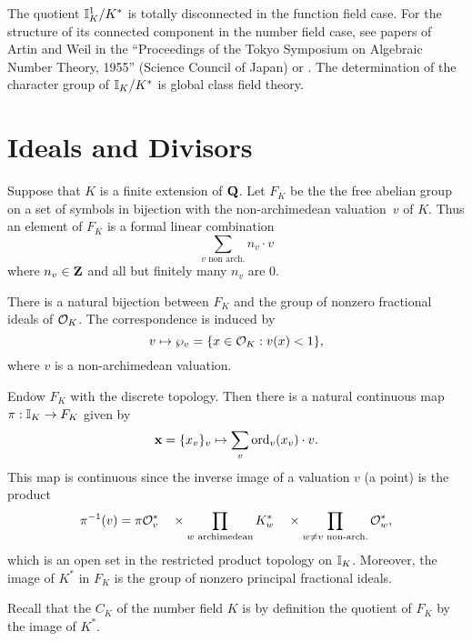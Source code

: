 \begin{remark}
  The quotient $\mathbb{I}_K^1/K^*$ is totally disconnected in the function
  field case.  For the structure of its connected component in the
  number field case, see papers of Artin and Weil in the ``Proceedings
  of the Tokyo Symposium on Algebraic Number Theory, 1955'' (Science
  Council of Japan) or \cite{artin-tate:cft}. The determination of the
  character group of $\mathbb{I}_K/K^*$ is global class field theory.
\end{remark}

\section{Ideals and Divisors}
Suppose that $K$ is a finite extension of $\mathbf{Q}$.  Let $F_K$ be the the
free abelian group on a set of symbols in bijection with the
non-archimedean valuation~$v$ of $K$.  Thus an element of $F_K$
is a formal linear combination 
$$
  \sum_{v\text{ non arch.}} n_v \cdot v
$$
where $n_v\in\mathbf{Z}$ and all but finitely many $n_v$ are $0$. 

\begin{lemma}
  There is a natural bijection between $F_K$ and the group of nonzero
  fractional ideals of $\mathcal{O}_K$.  The correspondence is induced by
  $$ v\mapsto \wp_v = \{x \in \mathcal{O}_K : v(x)<1\},$$
where $v$ is a non-archimedean valuation.
\end{lemma}


Endow $F_K$ with the discrete topology.  Then there is a natural
continuous map $\pi:\mathbb{I}_K \to F_K$ given by
$$
\mathbf{x} = \{x_v\}_v \mapsto \sum_v \operatorname{ord}_v(x_v)\cdot v.
$$
This map is continuous since the inverse image of 
a valuation $v$ (a point) is the product 
$$
\pi^{-1}(v) = \pi \mathcal{O}_v^* \quad \times 
\prod_{w \text{ archimedean}} K_w^*\quad
\times \prod_{w\neq v \text{ non-arch.}} \mathcal{O}_w^*,
$$
which is an open set in the restricted product
topology on $\mathbb{I}_K$.
Moreover, the image of $K^*$ in $F_K$ is the group of nonzero
principal fractional ideals.

Recall that the  $C_K$ of the number field $K$
is by definition the quotient of $F_K$ by the image of $K^*$.

